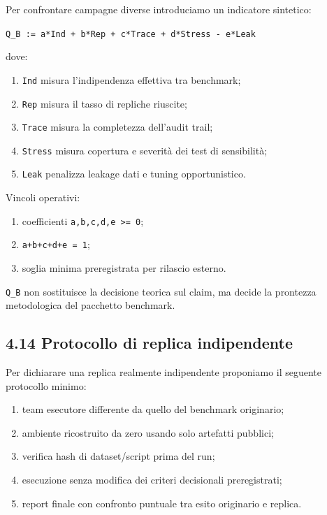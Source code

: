 Per confrontare campagne diverse introduciamo un indicatore sintetico:

\texttt{Q\_B\ :=\ a*Ind\ +\ b*Rep\ +\ c*Trace\ +\ d*Stress\ -\ e*Leak}

dove:

\begin{enumerate}
\def\labelenumi{\arabic{enumi}.}
\tightlist
\item
  \texttt{Ind} misura l'indipendenza effettiva tra benchmark;
\item
  \texttt{Rep} misura il tasso di repliche riuscite;
\item
  \texttt{Trace} misura la completezza dell'audit trail;
\item
  \texttt{Stress} misura copertura e severità dei test di sensibilità;
\item
  \texttt{Leak} penalizza leakage dati e tuning opportunistico.
\end{enumerate}

Vincoli operativi:

\begin{enumerate}
\def\labelenumi{\arabic{enumi}.}
\tightlist
\item
  coefficienti \texttt{a,b,c,d,e\ \textgreater{}=\ 0};
\item
  \texttt{a+b+c+d+e\ =\ 1};
\item
  soglia minima preregistrata per rilascio esterno.
\end{enumerate}

\texttt{Q\_B} non sostituisce la decisione teorica sul claim, ma decide la prontezza metodologica del pacchetto benchmark.

\subsection{4.14 Protocollo di replica indipendente}

Per dichiarare una replica realmente indipendente proponiamo il seguente protocollo minimo:

\begin{enumerate}
\def\labelenumi{\arabic{enumi}.}
\tightlist
\item
  team esecutore differente da quello del benchmark originario;
\item
  ambiente ricostruito da zero usando solo artefatti pubblici;
\item
  verifica hash di dataset/script prima del run;
\item
  esecuzione senza modifica dei criteri decisionali preregistrati;
\item
  report finale con confronto puntuale tra esito originario e replica.
\end{enumerate}

